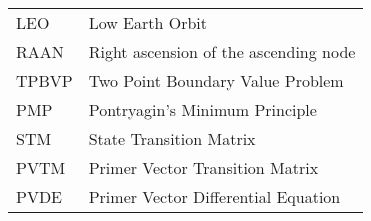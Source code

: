 \begin{longtable}{ll}
LEO & Low Earth Orbit \\
RAAN & Right ascension of the ascending node \\
TPBVP & Two Point Boundary Value Problem \\
PMP & Pontryagin's Minimum Principle \\
STM & State Transition Matrix \\
PVTM & Primer Vector Transition Matrix \\
PVDE & Primer Vector Differential Equation \\
\end{longtable}

